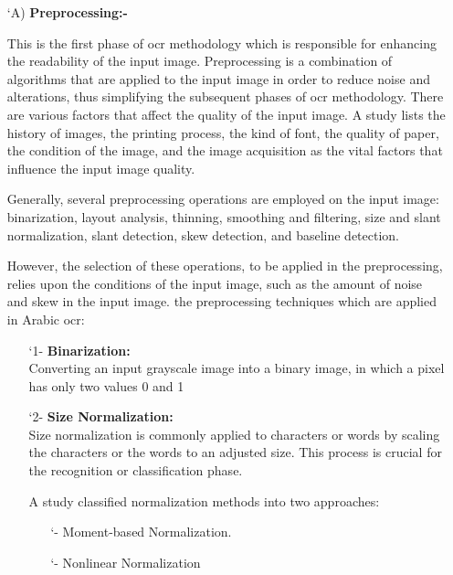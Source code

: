 \begin{itemize}[labelindent=1em,labelsep=0.25cm,leftmargin=*]
        \item[\char `A)] \textbf{Preprocessing:- } 
        
        This is the first phase of \acrshort{ocr} methodology which is responsible for enhancing the readability of the input image.
Preprocessing is a combination of algorithms that are applied to the input image in order to reduce noise and alterations, thus simplifying the subsequent phases of \acrshort{ocr} methodology. There are various factors that affect the quality of the input image. A study lists the history of images, the printing process, the kind of font, the quality of paper, the condition of the image, and the image acquisition as the vital factors that influence the input image quality. 

Generally, several preprocessing operations are employed on the input image: binarization, layout analysis, thinning, smoothing and filtering, size and slant normalization, slant detection, skew detection, and baseline detection.

However, the selection of these operations, to be applied in the preprocessing, relies upon the conditions of the input image, such as the amount of noise and skew in the input image. 
the preprocessing techniques which are applied in Arabic \acrshort{ocr}:
\begin{itemize}[labelindent=1em,labelsep=0.25cm,leftmargin=*]
        \item[\char `1-] \textbf{Binarization:}\\
        Converting an input grayscale image into a binary image, in which a pixel has only two values 0 and 1
        \item[\char `2-] \textbf{Size Normalization:}\\
        Size normalization is commonly applied to characters or words by scaling the characters or the words to an adjusted size.
        This process is crucial for the recognition or classification phase.
        
       A study classified normalization methods into two approaches:
       \begin{itemize}[itemsep=1pt, topsep=5pt]
        \item[\char `-]  Moment-based Normalization.
        \item[\char `-]  Nonlinear Normalization 
        \end{itemize} 


\end{itemize}
\end{itemize}
